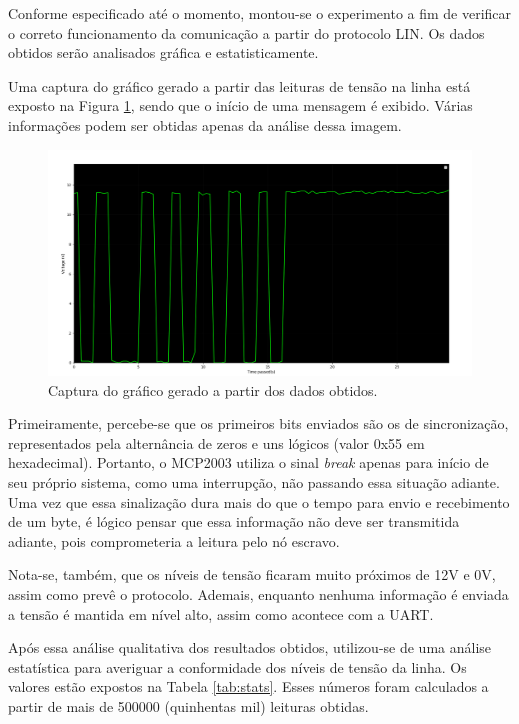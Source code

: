 

Conforme especificado até o momento, montou-se o experimento a fim de verificar o correto funcionamento da comunicação a partir do protocolo LIN. Os dados obtidos serão analisados gráfica e estatisticamente.

Uma captura do gráfico gerado a partir das leituras de tensão na linha está exposto na Figura \ref{fig:plot}, sendo que o início de uma mensagem é exibido. Várias informações podem ser obtidas apenas da análise dessa imagem.

\begin{figure}[H]
    \centering
    \includegraphics[width=.5\textwidth]{../figs/plot}
    \caption{Captura do gráfico gerado a partir dos dados obtidos.}
    \label{fig:plot}
\end{figure}

Primeiramente, percebe-se que os primeiros bits enviados são os de sincronização, representados pela alternância de zeros e uns lógicos (valor 0x55 em hexadecimal). Portanto, o MCP2003 \cite{datasheet:mcp2003} utiliza o sinal \textit{break} apenas para início de seu próprio sistema, como uma interrupção, não passando essa situação adiante. Uma vez que essa sinalização dura mais do que o tempo para envio e recebimento de um byte, é lógico pensar que essa informação não deve ser transmitida adiante, pois comprometeria a leitura pelo nó escravo.

Nota-se, também, que os níveis de tensão ficaram muito próximos de 12V e 0V, assim como prevê o protocolo. Ademais, enquanto nenhuma informação é enviada a tensão é mantida em nível alto, assim como acontece com a UART. 

Após essa análise qualitativa dos resultados obtidos, utilizou-se de uma análise estatística para averiguar a conformidade dos níveis de tensão da linha. Os valores estão expostos na Tabela \ref{tab:stats}. Esses números foram calculados a partir de mais de 500000 (quinhentas mil) leituras obtidas.

